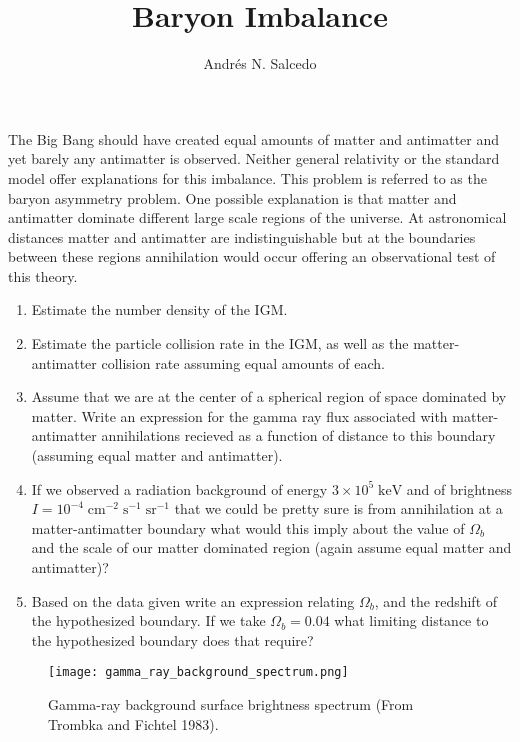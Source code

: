 \documentclass{article}
\title{Baryon Imbalance}
\author{Andr\'{e}s N. Salcedo}
\begin{document}
\maketitle

The Big Bang should have created equal amounts of matter and antimatter and yet barely any antimatter is observed. Neither general relativity or the standard model offer explanations for this imbalance. This problem is referred to as the baryon asymmetry problem. One possible explanation is that matter and antimatter dominate different large scale regions of the universe. At astronomical distances matter and antimatter are indistinguishable but at the boundaries between these regions annihilation would occur offering an observational test of this theory. 

\begin{enumerate}

\item Estimate the number density of the IGM.

\item Estimate the particle collision rate in the IGM, as well as the matter-antimatter collision rate assuming equal amounts of each.

\item Assume that we are at the center of a spherical region of space dominated by matter. Write an expression for the gamma ray flux associated with matter-antimatter annihilations recieved as a function of distance to this boundary (assuming equal matter and antimatter).

\item If we observed a radiation background of energy $3 \times 10^5 \; \mathrm{keV}$ and of brightness $I = 10^{-4} \; \mathrm{cm^{-2}} \; \mathrm{s^{-1}} \; \mathrm{sr^{-1}}$ that we could be pretty sure is from annihilation at a matter-antimatter boundary what would this imply about the value of $\Omega_b$ and the scale of our matter dominated region (again assume equal matter and antimatter)?

\item Based on the data given write an expression relating $\Omega_b$, and the redshift of the hypothesized boundary. If we take $\Omega_b = 0.04$ what limiting distance to the hypothesized boundary does that require?

\end{enumerate}


\begin{figure}
\begin{center}
\texttt{[image: gamma\_ray\_background\_spectrum.png]}
\caption{Gamma-ray background surface brightness spectrum (From Trombka and Fichtel 1983).}
\end{center}
\end{figure}
\end{document}
